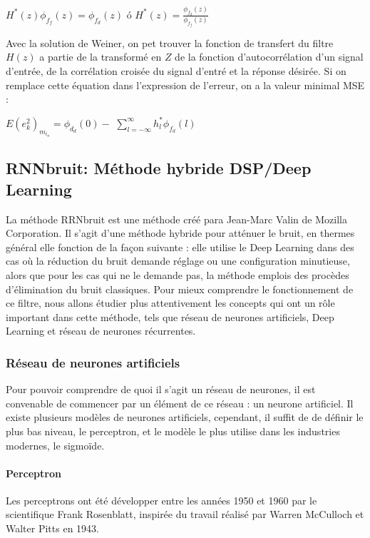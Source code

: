 \documentclass[conference,onecolumn]{IEEEtran}
\begin{document}
\begin{center}
     $H^*(z) \phi_f_f(z)=\phi_f_d(z)$  $ó$  $H^*(z)=\frac{\phi_f_d(z)}{\phi_f_f(z)}$
\end{center}

Avec la solution de Weiner, on pet trouver la fonction de transfert du filtre $H(z)$ a partie de la transformé en $Z$ de la fonction d’autocorrélation d’un signal d’entrée, de la corrélation croisée du signal d’entré et la réponse désirée. Si on remplace cette équation dans l’expression de l’erreur, on a la valeur minimal MSE :

\begin{center}
     $E(e_k^2)_m_i_n=\phi_d_d(0)-$ $\displaystyle\sum_{l= -\infty}^{\infty}h_l^* \phi_f_d(l)$
\end{center}


\subsection{\textbf{RNNbruit: Méthode hybride DSP/Deep Learning}}
La méthode RRNbruit est une méthode créé para Jean-Marc Valin de Mozilla Corporation. Il s’agit d’une méthode hybride pour atténuer le bruit, en thermes général elle fonction de la façon suivante : elle utilise le Deep Learning dans des cas où la réduction du bruit demande réglage ou une configuration minutieuse, alors que pour les cas qui ne le demande pas, la méthode emplois des procèdes d’élimination du bruit classiques. Pour mieux comprendre le fonctionnement de ce filtre, nous allons étudier plus attentivement les concepts qui ont un rôle important dans cette méthode, tels que réseau de neurones artificiels, Deep Learning et réseau de neurones récurrentes. 

\subsubsection{Réseau de neurones artificiels}
Pour pouvoir comprendre de quoi il s’agit un réseau de neurones, il est convenable de commencer par un élément de ce réseau : un neurone artificiel. Il existe plusieurs modèles de neurones artificiels, cependant, il suffit de de définir le plus bas niveau, le perceptron, et le modèle le plus utilise dans les industries modernes, le sigmoïde. 

\paragraph{Perceptron}
Les perceptrons ont été développer entre les années 1950 et 1960 par le scientifique Frank Rosenblatt, inspirée du travail réalisé par Warren McCulloch et Walter Pitts en 1943. 
\end{document}
